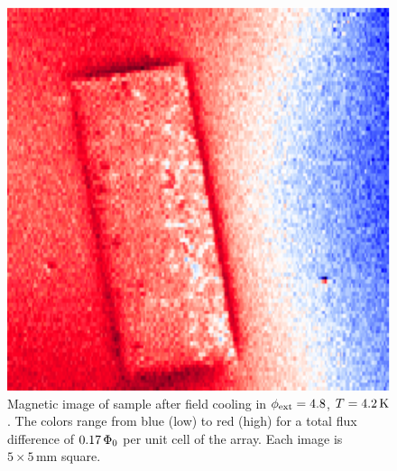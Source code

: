 \begin{figure}[p]
\includegraphics[width=5.7in]{figs/pme_exp/fig3_5_a_lg.ps}
\caption[Magnetic image of sample after field cooling in $\phiext = 4.8$,
$T=4.2\,\kelvin$.]{
Magnetic image of sample after field cooling in $\phiext = 4.8$,
$T=4.2\,\kelvin$.
The colors range from blue (low) to red (high) for 
a total flux difference of $0.17\,\Phi_0$ per unit cell of the
array. Each image is $5\times 5\,\mathrm{mm}$ square.}
\label{fig:pme_scanning_passes_a}
\end{figure}

